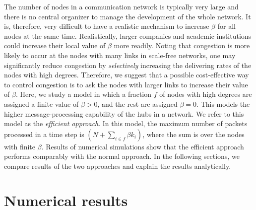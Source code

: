 \documentclass[aps,prl,twocolumn,superscriptaddress,showpacs]{revtex4}
\begin{document}
The number of nodes in a communication network is typically very
large and there is no central organizer to manage the development
of the whole network.  It is, therefore, very difficult to have a
realistic mechanism to increase $\beta$ for all nodes at the same
time. Realistically, larger companies and academic institutions
could increase their local value of $\beta$ more readily. Noting
that congestion is more likely to occur at the nodes with many
links in scale-free networks, one may significantly reduce
congestion by {\em selectively} increasing the delivering rates of
the nodes with high degrees.  Therefore, we suggest that a
possible cost-effective way to control congestion is to ask the
nodes with larger links to increase their value of $\beta$. Here,
we study a model in which a fraction $f$ of nodes with high
degrees are assigned a finite value of $\beta >0$, and the rest
are assigned $\beta =0$. This models the higher message-processing
capability of the hubs in a network.  We refer to this model as
the {\em efficient approach}. In this model, the maximum number of
packets processed in a time step is $(N+\sum_{i\in f}\beta k_i)$,
where the sum is over the nodes with finite $\beta$. Results of
numerical simulations show that the efficient approach performs
comparably with the normal approach. In the following sections, we
compare results of the two approaches and explain the results
analytically.

\section{Numerical results}
\end{document}
